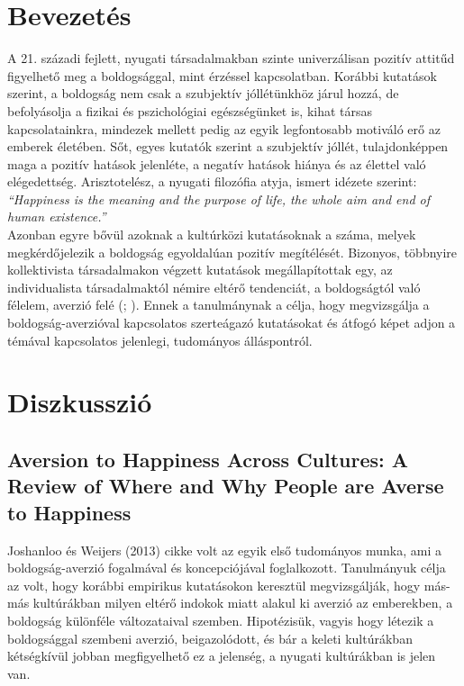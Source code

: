 \section{Bevezetés}
A 21. századi fejlett, nyugati társadalmakban szinte univerzálisan pozitív attitűd figyelhető meg a boldogsággal, mint érzéssel kapcsolatban. Korábbi kutatások szerint, a boldogság nem csak a szubjektív jóllétünkhöz járul hozzá, de befolyásolja a fizikai és pszichológiai egészségünket is, kihat társas kapcsolatainkra, mindezek mellett pedig az egyik legfontosabb motiváló erő az emberek életében. Sőt, egyes kutatók szerint a szubjektív jóllét, tulajdonképpen maga a pozitív hatások jelenléte, a negatív hatások hiánya és az élettel való elégedettség.\cite{diener_suh_lucas_smith_1999} Arisztotelész, a nyugati filozófia atyja, ismert idézete szerint: \textit{“Happiness is the meaning and the purpose of life, the whole aim and end of human existence.”} \medskip 
\\ Azonban egyre bővül azoknak a kultúrközi kutatásoknak a száma, melyek megkérdő\-jelezik  a boldogság egyoldalúan pozitív megítélését. Bizonyos, többnyire kollektivista társadalmakon végzett kutatások megállapítottak egy, az individualista társa\-dalmaktól némire eltérő tendenciát, a boldogságtól való félelem, averzió felé (\cite{joshanloo_weijers_2013}; \cite{gruber_mauss_tamir_2011}). Ennek a tanulmánynak a célja, hogy megvizsgálja a boldogság-averzióval kapcsolatos szerteágazó kutatásokat és átfogó képet adjon a témával kapcsolatos jelenlegi, tudományos álláspontról. \medskip 

\pagebreak
\section {Diszkusszió}
\subsection{Aversion to Happiness Across Cultures: A Review
	of Where and Why People are Averse to Happiness \cite{joshanloo_weijers_2013}}
Joshanloo és Weijers (2013) cikke volt az egyik első tudományos munka, ami a boldogság-averzió fogalmával és koncepciójával foglalkozott. Tanulmányuk célja az volt, hogy korábbi empirikus kutatásokon keresztül megvizsgálják, hogy más-más kultúrákban milyen eltérő indokok miatt alakul ki averzió az emberekben, a boldogság különféle változataival szemben. Hipotézisük, vagyis hogy létezik a boldogsággal szembeni averzió, beigazolódott, és bár a keleti kultúrákban kétségkívül jobban megfigyelhető ez a jelenség, a nyugati kultúrákban is jelen van. 





